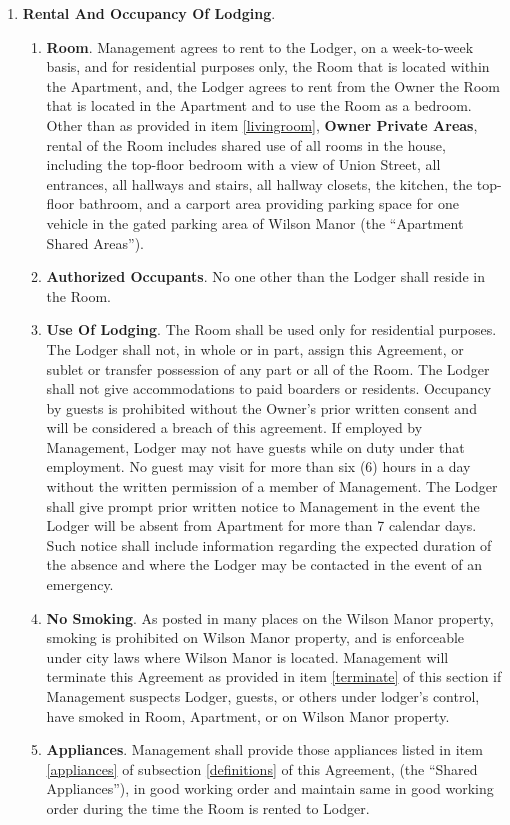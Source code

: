 \documentclass[12pt,letterpaper]{article}
\newcommand{\lodger}{Lodger}
\newcommand{\management}{Management}
\newcommand{\condo}{Wilson Manor}
\newcommand{\apt}{Apartment}
\newcommand{\room}{Room}
\newcommand{\shared}{Apartment Shared Areas}
\newcommand{\livingroom}{Owner Private Areas}
\newcommand{\appliances}{Shared Appliances}
\begin{document}
\begin{enumerate}
	\item \textbf{Rental And Occupancy Of Lodging}. 
		\begin{enumerate}
			\item \textbf{Room}.
				\management{} agrees to rent to the \lodger{}, on a week-to-week basis, and for residential purposes only, the \room{} that is located within the \apt{}, and, the \lodger{} agrees to rent from the Owner the \room{} that is located in the \apt{} and to use the \room{} as a bedroom.  Other than as provided in item \ref{livingroom}, \textbf{\livingroom{}}, rental of the \room{} includes shared use of all rooms in the house, including the top-floor bedroom with a view of Union Street, all entrances, all hallways and stairs, all hallway closets, the kitchen, the top-floor bathroom, and a carport area providing parking space for one vehicle in the gated parking area of \condo{} (the ``\shared{}'').
			\item \textbf{Authorized Occupants}. No one other than the \lodger{} shall reside in the \room{}. 
			\item \textbf{Use Of Lodging}. The \room{} shall be used only for residential purposes. The \lodger{} shall not, in whole or in part, assign this Agreement, or sublet or transfer possession of any part or all of the \room{}. The \lodger{} shall not give accommodations to paid boarders or residents. Occupancy by guests is prohibited without the Owner's prior written consent and will be considered a breach of this agreement. If employed by \management{}, \lodger{} may not have guests while on duty under that employment. No guest may visit for more than six (6) hours in a day without the written permission of a member of \management{}. The \lodger{} shall give prompt prior written notice to \management{} in the event the \lodger{} will be absent from \apt{} for more than 7 calendar days. Such notice shall include information regarding the expected duration of the absence and where the \lodger{} may be contacted in the event of an emergency. 
			\item \textbf{No Smoking}. As posted in many places on the \condo{} property, smoking is prohibited on \condo{} property, and is enforceable under city laws where \condo{} is located. \management{} will terminate this Agreement as provided in item \ref{terminate} of this section if \management{} suspects \lodger{}, guests, or others under lodger's control, have smoked in \room{}, \apt{}, or on \condo{} property.
			\item \textbf{Appliances}. \management{} shall provide those appliances listed in item \ref{appliances} of subsection \ref{definitions} of this Agreement{}, (the ``\appliances{}''), in good working order and maintain same in good working order during the time the \room{} is rented to \lodger{}.

\end{enumerate}
\end{enumerate}
\end{document}
